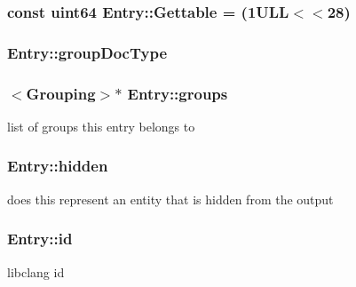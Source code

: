 \subsubsection[{Gettable}]{\setlength{\rightskip}{0pt plus 5cm}const {\bf uint64} Entry\+::\+Gettable = (1\+U\+L\+L$<$$<$28)\hspace{0.3cm}{\ttfamily [static]}}\label{class_entry_aecb46e9992b0cf2e49a14f2eaf74d60b}
\hypertarget{class_entry_a158710fdea38498193fe93713a280717}{}
\subsubsection[{group\+Doc\+Type}]{ Entry\+::group\+Doc\+Type}\label{class_entry_a158710fdea38498193fe93713a280717}
\hypertarget{class_entry_af10b19c474b2a7173a79b97124d25fc3}{}
\subsubsection[{groups}]{$<${\bf Grouping}$>$$\ast$ Entry\+::groups}\label{class_entry_af10b19c474b2a7173a79b97124d25fc3}


list of groups this entry belongs to 

\hypertarget{class_entry_acc4d59ae7ae3e94c3365ab8027593727}{}
\subsubsection[{hidden}]{ Entry\+::hidden}\label{class_entry_acc4d59ae7ae3e94c3365ab8027593727}


does this represent an entity that is hidden from the output 

\hypertarget{class_entry_a338fb12273a1a4f5dc124a1faf47d473}{}
\subsubsection[{id}]{ Entry\+::id}\label{class_entry_a338fb12273a1a4f5dc124a1faf47d473}


libclang id 

